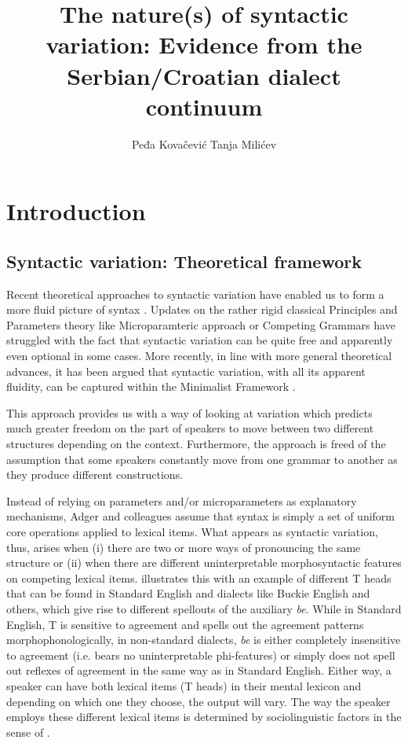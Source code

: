 \documentclass[output=paper,
modfonts,
newtxmath,
hidelinks,
]{langscibook}
\title{The nature(s) of syntactic variation: Evidence from the Serbian/Croatian dialect continuum}
\author{%
 Peđa Kovačević\affiliation{University of Novi Sad}\lastand 
 Tanja Milićev\affiliation{University of Novi Sad}
}
\begin{document}
\maketitle
{}

\section{Introduction}\label{s1}

\subsection{Syntactic variation: {T}heoretical framework}\label{s1.1}

Recent theoretical approaches to syntactic variation have enabled us to form a more fluid picture of syntax \citep{Adger2006,AdgerTrousdale2007,AdgerSmith2005}. Updates on the rather rigid classical Principles and Parameters theory \citep{ChomskyLasnik1995} like   Microparamteric approach or  Competing Grammars have struggled with the fact that syntactic variation can be quite free and apparently even optional in some cases. More recently, in line with more general theoretical advances, it has been argued that syntactic variation, with all its apparent fluidity, can be captured within the Minimalist Framework \citep{Adger2006,AdgerTrousdale2007,AdgerSmith2005}.

This approach provides us with a way of looking at variation which predicts much greater freedom on the part of speakers to move between two different structures depending on the context. Furthermore, the approach is freed of the assumption that some speakers constantly move from one grammar to another as they produce different constructions.\largerpage[2]

Instead of relying on parameters and/or microparameters as explanatory mechanisms, Adger and colleagues assume that syntax is simply a set of uniform core operations applied to lexical items. What appears as syntactic variation, thus, arises when (i) there are two or more ways of pronouncing the same structure or (ii) when there are different uninterpretable morphosyntactic features on competing lexical items. \citet{Adger2006} illustrates this with an example of different T heads that can be found in Standard English and dialects like Buckie English and others, which give rise to different spellouts of the auxiliary \textit{be}. While in Standard English, T is sensitive to agreement and spells out the agreement patterns morphophonologically, in non-standard dialects, \textit{be} is either completely insensitive to agreement (i.e. bears no uninterpretable phi-features) or simply does not spell out reflexes of agreement in the same way as in Standard English. Either way, a speaker can have both lexical items (T heads) in their mental lexicon and depending on which one they choose, the output will vary. The way the speaker employs these different lexical items is determined by sociolinguistic factors in the sense of \citet{Labov1972}.
\end{document}
